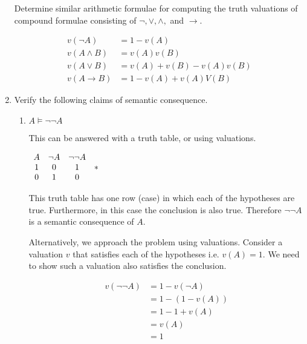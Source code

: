 \documentclass[11pt]{report}
\begin{document}
\begin{enumerate}
	Determine similar arithmetic formulae for computing the truth valuations of compound formulae consisting of $\lnot, \lor, \land,$ and $\rightarrow$.

	\hspace{0.2cm}{\bf Solution}

	\begin{equation*}
		\begin{split}
			v(\lnot A) &= 1 - v(A)\\
			v(A \land B) &= v(A)v(B)\\
			v(A \lor B) &= v(A) + v(B) - v(A)v(B)\\
			v(A \to B) &= 1 - v(A) + v(A)V(B)
		\end{split}
	\end{equation*}
	
	\newpage
	\item Verify the following claims of semantic consequence.
	
	\begin{enumerate}
		\item $ A \models \lnot\lnot A$
		
		\hspace{0.2cm}{\bf Solution}

		This can be answered with a truth table, or using valuations. 

		\begin{center}
			$\begin{array}{c c c c}
				A & \lnot A & \lnot \lnot A & \ \\
				1 & 0 & 1 & * \\
				0 & 1 & 0 & \ 
			\end{array}$
		\end{center}

		This truth table has one row (case) in which each of the hypotheses are true. Furthermore, in this case the conclusion is also true. Therefore $\lnot \lnot A$ is a semantic consequence of $A$. 

		Alternatively, we approach the problem using valuations. Consider a valuation $v$ that satisfies each of the hypotheses i.e. $v(A) = 1$. We need to show such a valuation also satisfies the conclusion. 

		\begin{equation*}
			\begin{split}
				v(\lnot \lnot A) &= 1 - v(\lnot A)\\
				&= 1 - (1 - v(A))\\
				& = 1 - 1 + v(A)\\ 
				&= v(A)\\ 
				&= 1
			\end{split}
		\end{equation*}


\end{enumerate}
\end{enumerate}
\end{document}
